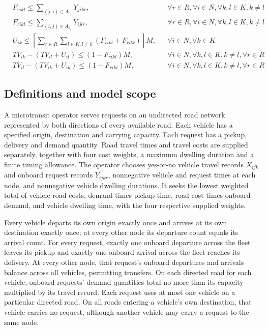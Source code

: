 \documentclass[10pt]{article}
\begin{document}
\[\begin{aligned}
& F_{rikl} \leq \sum_{(j,i) \in A_{u_i}} Y_{jikr}, && \forall r \in R, \forall i \in N, \forall k, l \in K, k \neq l \\
& F_{rikl} \leq \sum_{(i,j) \in A_{d_i}} Y_{ijlr}, && \forall r \in R, \forall i \in N, \forall k, l \in K, k \neq l \\
& U_{ik} \leq \left[ \sum_{r \in R} \sum_{l \in K, l \neq k} (F_{rikl} + F_{rilk}) \right] M, && \forall i \in N, \forall k \in K \\
& TV_{ik} - (TV_{il} + U_{il}) \leq (1 - F_{rikl}) M, && \forall i \in N, \forall k, l \in K, k \neq l, \forall r \in R \\
& TV_{il} - (TV_{ik} + U_{ik}) \leq (1 - F_{rikl}) M, && \forall i \in N, \forall k, l \in K, k \neq l, \forall r \in R
\end{aligned}
\]

\subsection*{Definitions and model scope}
A microtransit operator serves requests on an undirected road network represented by both directions of every available road. Each vehicle has a specified origin, destination and carrying capacity. Each request has a pickup, delivery and demand quantity. Road travel times and travel costs are supplied separately, together with four cost weights, a maximum dwelling duration and a finite timing allowance. The operator chooses yes-or-no vehicle travel records $X_{ijk}$ and onboard request records $Y_{ijkr}$, nonnegative vehicle and request times at each node, and nonnegative vehicle dwelling durations. It seeks the lowest weighted total of vehicle road costs, demand times pickup time, road cost times onboard demand, and vehicle dwelling time, with the four respective supplied weights.

Every vehicle departs its own origin exactly once and arrives at its own destination exactly once; at every other node its departure count equals its arrival count. For every request, exactly one onboard departure across the fleet leaves its pickup and exactly one onboard arrival across the fleet reaches its delivery. At every other node, that request's onboard departures and arrivals balance across all vehicles, permitting transfers. On each directed road for each vehicle, onboard requests' demand quantities total no more than its capacity multiplied by its travel record. Each request uses at most one vehicle on a particular directed road. On all roads entering a vehicle's own destination, that vehicle carries no request, although another vehicle may carry a request to the same node.
\end{document}
